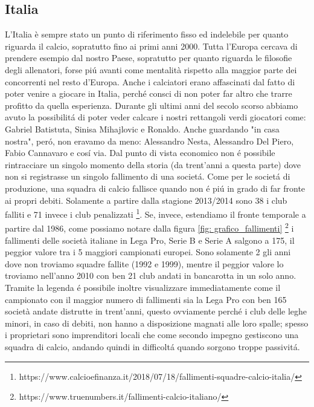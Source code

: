 \documentclass[
    corpo=11.5pt,
    oneside,
    evenboxes,
    tipotesi=triennale,
    stile=classica,
    oldstyle,
    autoretitolo,
    greek,
]{toptesi}
\begin{document}
\begin{interlinea}{1.5}
\subsection{Italia}
L'Italia è sempre stato un punto di riferimento fisso ed indelebile per quanto riguarda il calcio, sopratutto fino ai primi anni 2000.
Tutta l'Europa cercava di prendere esempio dal nostro Paese, sopratutto per quanto riguarda le filosofie degli allenatori, forse pi\'u
avanti come mentalità rispetto alla maggior parte dei concorrenti nel resto d'Europa. Anche i calciatori erano affascinati dal fatto di poter 
venire a giocare in Italia, perché consci di non poter far altro che trarre profitto da quella esperienza. Durante gli ultimi anni del
secolo scorso abbiamo avuto la possibilit\'a di poter veder calcare i nostri rettangoli verdi giocatori come: Gabriel Batistuta, Sinisa Mihajlovic e
Ronaldo. Anche guardando "in casa nostra", per\'o, non eravamo da meno: Alessandro Nesta, Alessandro Del Piero, Fabio Cannavaro e cos\'i via.
Dal punto di vista economico non \'e possibile rintracciare un singolo momento della storia (da trent'anni a questa parte) dove 
non si registrasse un singolo fallimento di una societ\'a. Come per le societ\'a di produzione, una squadra di calcio fallisce quando non
\'e pi\'u in grado di far fronte ai propri debiti. Solamente a partire dalla stagione 2013/2014 sono 38 i club falliti e 71 invece i club penalizzati \footnote{https://www.calcioefinanza.it/2018/07/18/fallimenti-squadre-calcio-italia/}. 
Se, invece, estendiamo il fronte temporale a partire dal 1986, come possiamo notare dalla figura \ref{fig: grafico_fallimenti} \footnote{https://www.truenumbers.it/fallimenti-calcio-italiano/}
i fallimenti delle società italiane in Lega Pro, Serie B e Serie A salgono a 175, il peggior valore tra i 5 maggiori campionati europei. 
Sono solamente 2 gli anni dove non troviamo squadre fallite (1992 e 1999), mentre il peggior valore lo troviamo nell'anno 2010 con ben 21 club andati in bancarotta
in un solo anno. Tramite la legenda \'e possibile inoltre visualizzare immediatamente come il campionato con il maggior numero di fallimenti sia
la Lega Pro con ben 165 società andate distrutte in trent'anni, questo ovviamente perch\'e i club delle leghe minori, in caso di debiti,
non hanno a disposizione magnati alle loro spalle; spesso i proprietari sono imprenditori locali che come secondo impegno gestiscono una
squadra di calcio, andando quindi in difficolt\'a quando sorgono troppe passivit\'a.


\end{interlinea}
\end{document}
